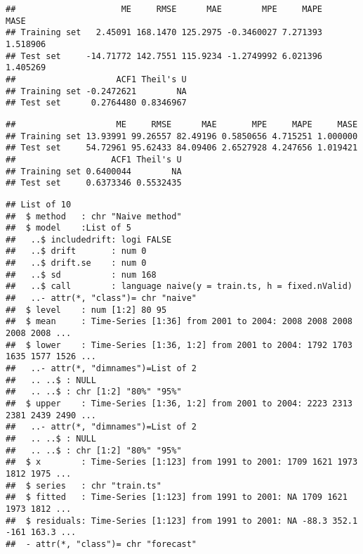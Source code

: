 \documentclass[]{article}
\begin{document}
\begin{verbatim}
##                     ME     RMSE      MAE        MPE     MAPE     MASE
## Training set   2.45091 168.1470 125.2975 -0.3460027 7.271393 1.518906
## Test set     -14.71772 142.7551 115.9234 -1.2749992 6.021396 1.405269
##                    ACF1 Theil's U
## Training set -0.2472621        NA
## Test set      0.2764480 0.8346967
\end{verbatim}

\begin{verbatim}
##                    ME     RMSE      MAE       MPE     MAPE     MASE
## Training set 13.93991 99.26557 82.49196 0.5850656 4.715251 1.000000
## Test set     54.72961 95.62433 84.09406 2.6527928 4.247656 1.019421
##                   ACF1 Theil's U
## Training set 0.6400044        NA
## Test set     0.6373346 0.5532435
\end{verbatim}

\begin{verbatim}
## List of 10
##  $ method   : chr "Naive method"
##  $ model    :List of 5
##   ..$ includedrift: logi FALSE
##   ..$ drift       : num 0
##   ..$ drift.se    : num 0
##   ..$ sd          : num 168
##   ..$ call        : language naive(y = train.ts, h = fixed.nValid)
##   ..- attr(*, "class")= chr "naive"
##  $ level    : num [1:2] 80 95
##  $ mean     : Time-Series [1:36] from 2001 to 2004: 2008 2008 2008 2008 2008 ...
##  $ lower    : Time-Series [1:36, 1:2] from 2001 to 2004: 1792 1703 1635 1577 1526 ...
##   ..- attr(*, "dimnames")=List of 2
##   .. ..$ : NULL
##   .. ..$ : chr [1:2] "80%" "95%"
##  $ upper    : Time-Series [1:36, 1:2] from 2001 to 2004: 2223 2313 2381 2439 2490 ...
##   ..- attr(*, "dimnames")=List of 2
##   .. ..$ : NULL
##   .. ..$ : chr [1:2] "80%" "95%"
##  $ x        : Time-Series [1:123] from 1991 to 2001: 1709 1621 1973 1812 1975 ...
##  $ series   : chr "train.ts"
##  $ fitted   : Time-Series [1:123] from 1991 to 2001: NA 1709 1621 1973 1812 ...
##  $ residuals: Time-Series [1:123] from 1991 to 2001: NA -88.3 352.1 -161 163.3 ...
##  - attr(*, "class")= chr "forecast"
\end{verbatim}
\end{document}
